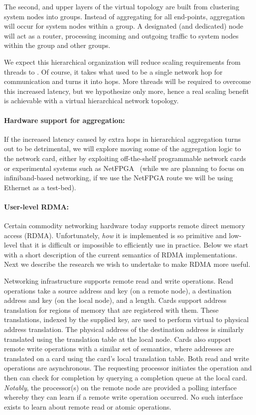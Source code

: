 The second, and upper layers of the virtual topology are built from clustering system nodes into groups.  Instead of aggregating for all end-points, aggregation will occur for system nodes within a group.  A designated (and dedicated) node will act as a router, processing incoming and outgoing traffic to system nodes within the group and other groups.

We expect this hierarchical organization will reduce scaling requirements from  threads to . Of course, it takes what used to be a single network hop for communication and turns it into  hops. More threads will be required to overcome this increased latency, but we hypothesize only  more, hence a real  scaling benefit is achievable with a virtual hierarchical network topology.

\paragraph{Hardware support for aggregation:} If the increased latency caused by extra hops in hierarchical aggregation turns out to be detrimental, we will explore moving some of the aggregation logic to the network card, either by exploiting off-the-shelf programmable network cards or experimental systems such as NetFPGA~\cite{netfpga} (while we are planning to focus on infiniband-based networking, if we use the NetFPGA route we will be using Ethernet as a test-bed).

\paragraph{User-level RDMA:} Certain commodity networking hardware today supports remote direct memory access (RDMA). Unfortunately, \emph{how} it is implemented is so primitive and low-level that it is difficult or impossible to efficiently use in practice. Below we start with a short description of the current semantics of RDMA implementations. Next we describe the research we wish to undertake to make RDMA more useful.

Networking infrastructure supports remote read and write operations. Read operations take a source address and key (on a remote node), a destination address and key (on the local node), and a length. Cards support address translation for regions of memory that are registered with them. These translations, indexed by the supplied key, are used to perform virtual to physical address translation. The physical address of the destination address is similarly translated using the translation table at the local node. Cards also support remote write operations with a similar set of semantics, where addresses are translated on a card using the card's local translation table. Both read and write operations are asynchronous. The requesting processor initiates the operation and then can check for completion by querying a completion queue at the local card. \emph{Notably}, the processor(s) on the remote node are provided a polling interface whereby they can learn if a remote write operation occurred. No such interface exists to learn about remote read or atomic operations.

